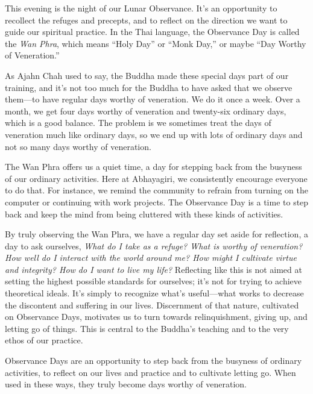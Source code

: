 
This evening is the night of our Lunar Observance. It's an opportunity 
to recollect the refuges and precepts, and to reflect on the direction 
we want to guide our spiritual practice. In the Thai language, the 
Observance Day is called the \emph{Wan Phra}, which means ``Holy Day'' 
or ``Monk Day,'' or maybe ``Day Worthy of Veneration.''

As Ajahn Chah used to say, the Buddha made these special days part of 
our training, and it's not too much for the Buddha to have asked that 
we observe them---to have regular days worthy of veneration. We do it 
once a week. Over a month, we get four days worthy of veneration and 
twenty-six ordinary days, which is a good balance. The problem is we 
sometimes treat the days of veneration much like ordinary days, so we 
end up with lots of ordinary days and not so many days worthy of 
veneration.

The Wan Phra offers us a quiet time, a day for stepping back from the 
busyness of our ordinary activities. Here at Abhayagiri, we 
consistently encourage everyone to do that. For instance, we remind the 
community to refrain from turning on the computer or continuing with 
work projects. The Observance Day is a time to step back and keep the 
mind from being cluttered with these kinds of activities.

By truly observing the Wan Phra, we have a regular day set aside for 
reflection, a day to ask ourselves, \emph{What do I take as a refuge? 
What is worthy of veneration? How well do I interact with the world 
around me? How might I cultivate virtue and integrity? How do I want to 
live my life?} Reflecting like this is not aimed at setting the highest 
possible standards for ourselves; it's not for trying to achieve 
theoretical ideals. It's simply to recognize what's useful---what works 
to decrease the discontent and suffering in our lives. Discernment of 
that nature, cultivated on Observance Days, motivates us to turn 
towards relinquishment, giving up, and letting go of things. This is 
central to the Buddha's teaching and to the very ethos of our practice.

Observance Days are an opportunity to step back from the busyness of 
ordinary activities, to reflect on our lives and practice and to 
cultivate letting go. When used in these ways, they truly become days 
worthy of veneration.

